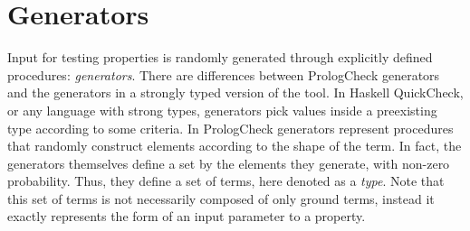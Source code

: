 \documentclass[runningheads,a4paper]{../../PaperStyles/llncs}
\newcommand{\todo}[2][?]{\marginpar{\raggedright \tiny TODO: #2}}
\newcommand{\Prolog}[0]{{\sf Prolog}}
\newcommand{\Haskell}[0]{{\sf Haskell}}
\newcommand{\QuickCheck}[0]{{\sf QuickCheck}}
\newcommand{\plqc}[0]{{\sf PrologCheck}}
\begin{document}



\section{Generators}
\label{sec:generators}

Input for testing properties is randomly generated through explicitly
defined procedures: \emph{generators}.
%
There are  differences between \plqc{} generators and the
generators in a strongly typed version of the tool.
%
In \Haskell{} \QuickCheck{}, or any language with strong types,
generators pick values inside a preexisting type according to some criteria.
%
In \plqc{} generators represent procedures that randomly construct
elements according to the shape of the term.
%
In fact, the generators themselves define 
a set by the elements
they generate, with non-zero probability.
%
Thus, they define a set of terms, here denoted as a \emph{type}.
%
Note that this set of terms is not necessarily composed of only ground
terms, instead it exactly represents the form of an input parameter to a
property.
\end{document}
